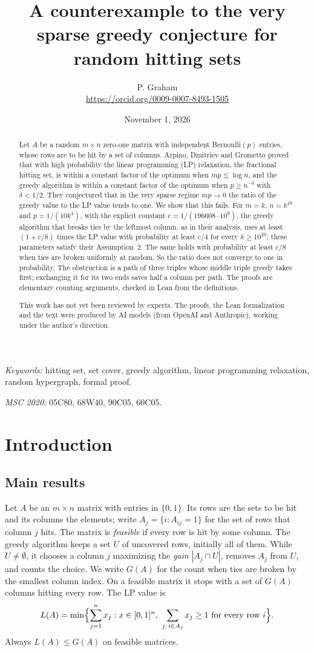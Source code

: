 \documentclass[11pt]{article}
\title{A counterexample to the very sparse greedy conjecture for random hitting sets}
\author{P. Graham\\ \small\url{https://orcid.org/0009-0007-8493-1505}}
\date{November 1, 2026}
\theoremstyle{remark}
\begin{document}
\maketitle
\begin{abstract}
Let $A$ be a random $m\times n$ zero-one matrix with independent
Bernoulli$(p)$ entries, whose rows are to be hit by a set of columns.
Arpino, Dmitriev and Grometto proved that with high probability the
linear programming (LP) relaxation, the fractional hitting set, is within
a constant factor of the optimum when $mp\lesssim\log n$, and the greedy
algorithm is within a constant factor of the optimum when $p\ge n^{-\delta}$
with $\delta<1/2$. They conjectured that in the very sparse regime
$mp\to0$ the ratio of the greedy value to the LP value tends to one. We
show that this fails. For $m=k$, $n=k^{10}$ and $p=1/(10k^4)$, with the
explicit constant $c=1/(196608\cdot10^9)$, the greedy algorithm that
breaks ties by the leftmost column, as in their analysis, uses at least
$(1+c/8)$ times the LP value with probability at least $c/4$ for every
$k\ge10^{20}$; these parameters satisfy their Assumption~2. The same holds
with probability at least $c/8$ when ties are broken uniformly at random.
So the ratio does not converge to one in probability. The obstruction is
a path of three triples whose middle triple greedy takes first; exchanging
it for its two ends saves half a column per path. The proofs are elementary
counting arguments, checked in Lean from the definitions.

This work has not yet been reviewed by experts.
The proofs, the Lean formalization and the text were produced by AI models
(from OpenAI and Anthropic), working under the author's direction.
\end{abstract}
\medskip
\noindent\textit{Keywords:} hitting set, set cover, greedy algorithm,
linear programming relaxation, random hypergraph, formal proof.

\noindent\textit{MSC 2020:} 05C80, 68W40, 90C05, 60C05.

\section{Introduction}

\subsection{Main results}
Let $A$ be an $m\times n$ matrix with entries in $\{0,1\}$. Its rows are
the sets to be hit and its columns the elements; write
$A_j=\{i:A_{ij}=1\}$ for the set of rows that column $j$ hits. The matrix
is \emph{feasible} if every row is hit by some column. The greedy
algorithm keeps a set $U$ of uncovered rows, initially all of them. While
$U\ne\emptyset$, it chooses a column $j$ maximizing the \emph{gain}
$|A_j\cap U|$, removes $A_j$ from $U$, and counts the choice. We write
$G(A)$ for the count when ties are broken by the smallest column index.
On a feasible matrix it stops with a set of $G(A)$ columns hitting every
row. The LP value is
\[
 L(A)=\min\Bigl\{\sum_{j=1}^n x_j : x\in[0,1]^n,\ \sum_{j:\,i\in A_j}x_j\ge1
 \text{ for every row } i\Bigr\}.
\]
Always $L(A)\le G(A)$ on feasible matrices.
\end{document}
